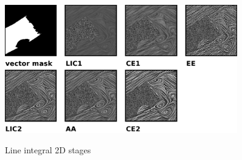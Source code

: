 \documentclass[a4paper,10pt]{article}
\begin{document}
\begin{figure}[ht]
	\centering
	\includegraphics[width=0.9\textwidth]{./images-data/dia-serial/lg-lic2d-200ppi.png}
	\label{fig:lic2d-outputs}
  \caption{Line integral 2D stages}
\end{figure}

\FloatBarrier
\end{document}
